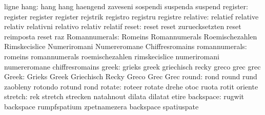                            ligne
                     hang: hang                      hang
                           haengend                  zaveseni
                           sospendi                  suspenda
                           suspend
                 register: register                  register
                           register                  rejstrik
                           registro                  registru
                           registre
                 relative: relatief                  relative
                           relativ                   relativni
                           relativo                  relativ
                           relatif
                    reset: reset                     reset
                           zuruecksetzten            reset
                           reimposta                 reset
                           raz
            Romannumerals: Romeins                   Romannumerals
                           Roemischezahlen           Rimskecislice
                           Numeriromani              Numereromane
                           Chiffresromains
            romannumerals: romeins                   romannumerals
                           roemischezahlen           rimskecislice
                           numeriromani              numereromane
                           chiffresromains
                    greek: grieks                    greek
                           griechisch                recky
                           greco                     grec
                           grec
                    Greek: Grieks                    Greek
                           Griechisch                Recky
                           Greco                     Grec
                           Grec
                    round: rond                      round
                           rund                      zaobleny
                           rotondo                   rotund
                           rond
                   rotate: roteer                    rotate
                           drehe                     otoc
                           ruota                     rotit
                           oriente
                  stretch: rek                       stretch
                           strecken                  natahnout
                           dilata                    dilatat
                           etire
                backspace: rugwit                    backspace
                           rumpfspatium              zpetnamezera
                           backspace                 spatiuspate
